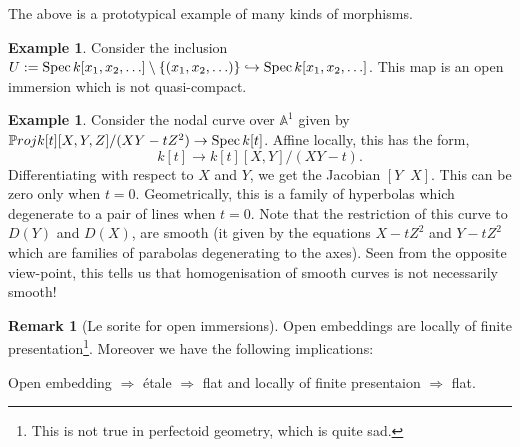 \documentclass[11pt]{amsart}
\newcommand{\Proj}{{\P roj}}
\newcommand{\Spec}{{\rm Spec \,}}
\newcommand{\A}{{\mathbb A}}
\renewcommand{\P}{{\mathbb P}}
\theoremstyle{definition}
\newtheorem{example}[theorem]{Example}
\newtheorem{remark}[theorem]{Remark}
\begin{document}
The above is a prototypical example of many kinds of morphisms.

\begin{example}
	Consider the inclusion $U:=\Spec k[x_1 ,x_2 ,\ldots] \setminus\lbrace (x_1 ,x_2 ,\ldots)\rbrace\hookrightarrow \Spec k[x_1 ,x_2 ,\ldots]$. This map is an open immersion which is not quasi-compact.%
\end{example}
	
	
\begin{example}\label{family-nodal}
	Consider the nodal curve over $\A^1$ given by $\Proj k[t][X,Y,Z]/(XY-tZ^2)\rightarrow \Spec k[t]$. Affine locally, this has the form,
	\[k[t]\rightarrow k[t][X,Y]/(XY-t).\]
	Differentiating with respect to $X$ and $Y$, we get the Jacobian $[Y\;\; X]$. This can be zero only when $t=0$. Geometrically, this is a family of hyperbolas which degenerate to a pair of lines when $t=0$. Note that the restriction of this curve to $D(Y)$ and $D(X)$, are smooth (it given by the equations $X-tZ^2$ and $Y-tZ^2$ which are families of parabolas degenerating to the axes). Seen from the opposite view-point, this tells us that homogenisation of smooth curves is not necessarily smooth!
\end{example}

\begin{remark}[Le sorite for open immersions]
Open embeddings are locally of finite presentation\footnote{This is not true in perfectoid geometry, which is quite sad.}. Moreover we have the following implications:

Open embedding $\Rightarrow$ \'{e}tale $\Rightarrow$ flat and locally of finite presentaion $\Rightarrow$ flat.
\end{remark}

\begin{comment}
\begin{enumerate}
	\item $x\mapsto x^2$ (more, generally $x^n$). This morphism is ramified at the origin (but unramified on $\A^1\setminus \lbrace 0\rbrace$), finitely presented, flat.
	\item A non-quasi-compact open immersion. $\Spec k[x_1,x_2,\ldots]\setminus\lbrace (x_1,x_2,\ldots)\rbrace\hookrightarrow \Spec k[x_1,x_2,\ldots]$ Polynomial ring in infinitely many variables and knock off the origin.
	\item A finite morphism. 
	\item A smooth morphism. A non-smooth morphism (nodal curve over $\A^1$).
	\item Open embeddings are locally of finite presentation\footnote{This is not true in perfectoid geometry, which is quite sad.}.
	\item Open embedding is \'{e}tale is fppf is fpqc.
\end{enumerate}
\end{comment}
\end{document}
